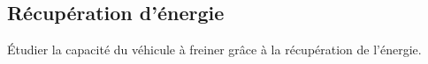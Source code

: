 \documentclass[10pt,fleqn]{article} %
\begin{document}
%
%
%
%

\subsection*{Récupération d'énergie}
\begin{obj}
Étudier la capacité du véhicule à freiner grâce à la récupération de l’énergie.
\end{obj}
\end{document}
